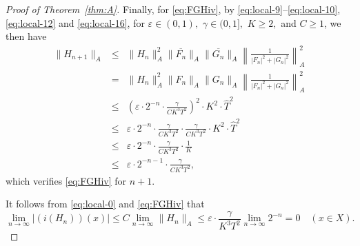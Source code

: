 \documentclass[12pt,fleqn]{amsart}
\theoremstyle{definition}
\numberwithin{equation}{section}
\theoremstyle{remark}
\newcommand{\e}{\varepsilon}
\begin{document}
\begin{proof}[Proof of Theorem~\ref{thm:A}]
Finally, for \eqref{eq:FGHiv}, by \eqref{eq:local-9}--\eqref{eq:local-10}, \eqref{eq:local-12} and \eqref{eq:local-16}, for $\e \in(0,1),$  $\gamma \in(0,1],$ $ K \geqslant 2,$ and $C\geqslant 1$, we then have
%
\begin{equation*}
    \begin{array}{lcl}
        \|H_{n+1}\|_{A}
        &\leqslant & 
        \|H_n\|_{A}^2
        \|\overline{F_n}\|_{A}
        \|\overline{G_n}\|_{A}
        \left\|\frac{1}{|F_n|^2+|G_n|^2}\right\|_{A}^2\\
        &=& 
        \|H_n\|_{A}^2
        \|F_n\|_{A}
        \|G_n\|_{A}
        \left\|\frac{1}{|F_n|^2+|G_n|^2}\right\|_{A}^2
        \\
        &\leqslant &
        \left(\e\cdot 2^{-n}\cdot\frac{\gamma}{CK^3T^2}\right)^2
        \cdot K^2 \cdot \widehat{T}^2\\
        &\leqslant &
        \e \cdot 2^{-n}\cdot\frac{\gamma}{CK^3T^2} \cdot\frac{\gamma}{CK^3T^2} \cdot K^2 \cdot \widehat{T}^2\\
        &\leqslant &
        \e \cdot 2^{-n}\cdot\frac{\gamma}{CK^3T^2} \cdot \frac{1}{K}\\
        & \leqslant &
        \e\cdot 2^{-n-1}\cdot\frac{\gamma}{C K^3 T^2},
    \end{array}
\end{equation*}
%
which verifies \eqref{eq:FGHiv} for $n+1$. 

It follows from \eqref{eq:local-0} and \eqref{eq:FGHiv} that 
%
\begin{equation}\label{eq:local-22}
    \lim_{n\to\infty}|(i(H_n))(x)|  \leqslant  C\lim_{n\to\infty}\|H_n\|_A
    \leqslant 
    \e\cdot\frac{\gamma}{K^3T^2}\lim_{n\to\infty}2^{-n}=0 \quad (x\in X).
\end{equation}
%


\end{proof}
\end{document}
